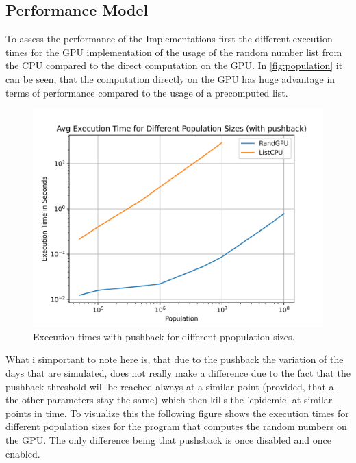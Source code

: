 \documentclass[12pt,a4paper]{article}
\begin{document}
\subsection*{Performance Model}
To assess the performance of the Implementations first the different execution times for the GPU implementation of the usage of the random number list from the CPU compared to the direct computation on the GPU. In \autoref*{fig:population} it can be seen, that the computation directly on the GPU has huge advantage in terms of performance compared to the usage of a precomputed list.
\begin{figure}[H]
    \centering
    \includegraphics[width=12cm]{../Population.png}
    \caption{Execution times with pushback for different ppopulation sizes.}
    \label{fig:population}
\end{figure}
What i simportant to note here is, that due to the pushback the variation of the days that are simulated, does not really make a difference due to the fact that the pushback threshold will be reached always at a similar point (provided, that all the other parameters stay the same) which then kills the 'epidemic' at similar points in time. To visualize this the following figure shows the execution times for different population sizes for the program that computes the random numbers on the GPU. The only difference being that pushsback is once disabled and once enabled.
\end{document}

